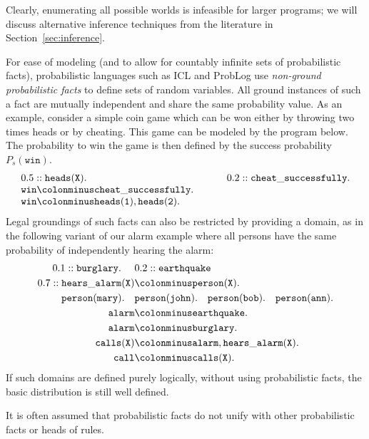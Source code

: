 \documentclass[a4paper]{article}
\begin{document}
Clearly, enumerating all possible worlds is infeasible for larger
programs; we will discuss alternative inference techniques from the
literature in Section~\ref{sec:inference}.


For ease of modeling (and to allow for countably infinite sets of
probabilistic facts), probabilistic languages such as ICL and ProbLog   use \emph{non-ground probabilistic facts} to define sets of random variables. All ground instances of such a fact are mutually independent and share the same probability value. 
As an example, consider a simple coin game which can be won either by throwing two times heads or by cheating. This game can be modeled by the program below. The probability to win the game is then defined by the success probability $P_s(\mathtt{win})$.
\begin{equation*}
\begin{array}{lll}
0.5 :: \mathtt{heads(X).} & ~~~~ & 0.2 :: \mathtt{cheat\_successfully.} \\
\mathtt{win \colonminus cheat\_successfully.}\\
\mathtt{win \colonminus heads(1), heads(2).}
\end{array}
\end{equation*}
Legal groundings of such facts can also be restricted by providing a
domain, as in the following variant of our alarm
example where all persons have the same probability of independently hearing
the alarm:
\begin{align*}
0.1::\mathtt{burglary.} ~~~~&0.2::\mathtt{earthquake} \\
0.7::\mathtt{hears\_alarm(X)}&\colonminus\mathtt{person(X).}\\
\mathtt{person(mary).~~~} &\mathtt{ person(john).  ~~~person(bob).  ~~~person(ann).}\\
\mathtt{alarm}&\colonminus\mathtt{earthquake.}\\
\mathtt{alarm}&\colonminus\mathtt{burglary.}\\
\mathtt{calls(X)}&\colonminus\mathtt{alarm, hears\_alarm(X).}\\
\mathtt{call}&\colonminus\mathtt{calls(X).}
\end{align*}
If such domains are defined purely logically, without using
probabilistic facts, the basic distribution is still
well defined. 


It is often assumed that probabilistic facts do not unify with other
probabilistic facts or heads of rules. 
\end{document}
